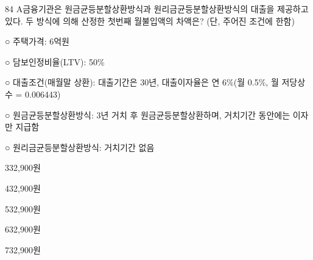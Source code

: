 \begin{question}{84}
A금융기관은 원금균등분할상환방식과 원리금균등분할상환방식의 대출을 제공하고 있다. 두 방식에 의해 산정한 첫번째 월불입액의 차액은? (단, 주어진 조건에 한함)
\begin{framedtext}
○ 주택가격: 6억원 \par
○ 담보인정비율(LTV): 50\% \par
○ 대출조건(매월말 상환): 대출기간은 30년, 대출이자율은 연 6\%(월 0.5\%, 월 저당상수 = 0.006443) \par
○ 원금균등분할상환방식: 3년 거치 후 원금균등분할상환하며, 거치기간 동안에는 이자만 지급함 \par
○ 원리금균등분할상환방식: 거치기간 없음
\end{framedtext}
\begin{choices}
  \item 332,900원
  \item 432,900원
  \item 532,900원
  \item 632,900원
  \item 732,900원
\end{choices}
\end{question}
